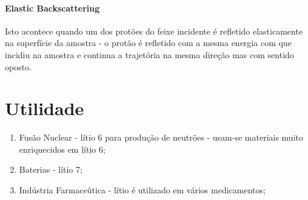 \documentclass{article}
\begin{document}
\begin{multicols}{2}
\paragraph*{Elastic Backscattering} Isto acontece quando um dos protões do feixe incidente é refletido elasticamente na superfície da amostra - o protão é refletido com a mesma energia com que incidiu na amostra e continua a trajetória na mesma direção mas com sentido oposto.

\section{Utilidade}

\begin{enumerate}
  \item Fusão Nuclear - lítio 6 para produção de neutrões -  usam-se materiais muito enriquecidos em lítio 6;
  \item Baterias - lítio 7;
  \item Indústria Farmaceûtica - lítio é utilizado em vários medicamentos;
\end{enumerate}

\printbibliography
\nocite{*}

\end{multicols}
\end{document}
